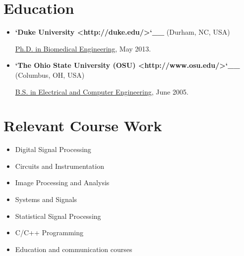 \documentclass[letterpaper,10pt,english]{sphinxmanual}
\begin{document}
\chapter{Education}
\label{resume:education}\begin{itemize}
\item {} 
\textbf{{}`Duke University \textless{}http://duke.edu/\textgreater{}{}`\_\_} (Durham, NC, USA)

\href{http://bme.duke.edu/grad}{Ph.D. in Biomedical Engineering}, May
2013.

\item {} 
\textbf{{}`The Ohio State University (OSU) \textless{}http://www.osu.edu/\textgreater{}{}`\_\_}
(Columbus, OH, USA)

\href{http://ece.osu.edu/futurestudents/undergrad}{B.S. in Electrical and Computer
Engineering}, June
2005.

\end{itemize}


\chapter{Relevant Course Work}
\label{resume:relevant-course-work}\begin{itemize}
\item {} 
Digital Signal Processing

\item {} 
Circuits and Instrumentation

\item {} 
Image Processing and Analysis

\item {} 
Systems and Signals

\item {} 
Statistical Signal Processing

\item {} 
C/C++ Programming

\item {} 
Education and communication courses

\end{itemize}
\end{document}
